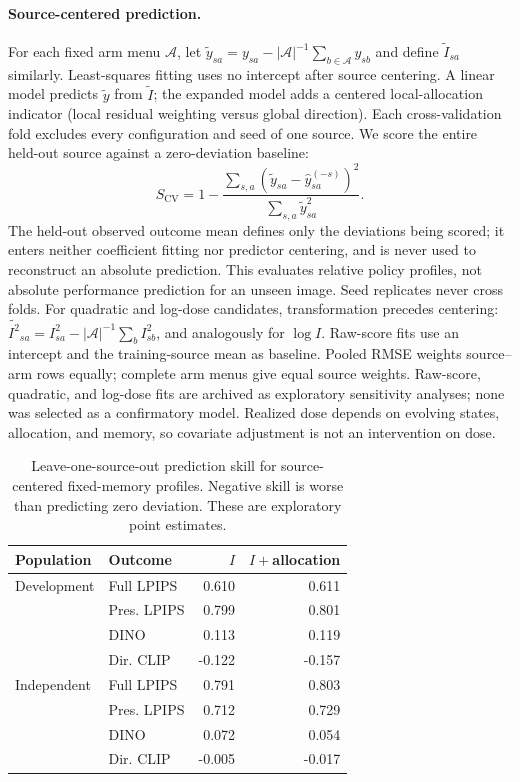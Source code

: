 \paragraph{Source-centered prediction.}
For each fixed arm menu $\mathcal A$, let $\widetilde y_{sa}=y_{sa}-|\mathcal A|^{-1}\sum_{b\in\mathcal A}y_{sb}$ and define $\widetilde I_{sa}$ similarly. Least-squares fitting uses no intercept after source centering. A linear model predicts $\widetilde y$ from $\widetilde I$; the expanded model adds a centered local-allocation indicator (local residual weighting versus global direction). Each cross-validation fold excludes every configuration and seed of one source. We score the entire held-out source against a zero-deviation baseline:
\begin{equation}
S_{\mathrm{CV}}=1-\frac{\sum_{s,a}(\widetilde y_{sa}-\widehat y_{sa}^{(-s)})^2}{\sum_{s,a}\widetilde y_{sa}^2}.
\end{equation}
The held-out observed outcome mean defines only the deviations being scored; it enters neither coefficient fitting nor predictor centering, and is never used to reconstruct an absolute prediction. This evaluates relative policy profiles, not absolute performance prediction for an unseen image. Seed replicates never cross folds. For quadratic and log-dose candidates, transformation precedes centering: $\widetilde{I^2}_{sa}=I_{sa}^2-|\mathcal A|^{-1}\sum_b I_{sb}^2$, and analogously for $\log I$. Raw-score fits use an intercept and the training-source mean as baseline. Pooled RMSE weights source--arm rows equally; complete arm menus give equal source weights. Raw-score, quadratic, and log-dose fits are archived as exploratory sensitivity analyses; none was selected as a confirmatory model. Realized dose depends on evolving states, allocation, and memory, so covariate adjustment is not an intervention on dose.

\begin{table}[t]
\centering\small
\caption{Leave-one-source-out prediction skill for source-centered fixed-memory profiles. Negative skill is worse than predicting zero deviation. These are exploratory point estimates.}
\label{tab:doseprediction}
\begin{tabular}{llrr}
\toprule
Population & Outcome & $I$ & $I+$allocation\\
\midrule
Development & Full LPIPS & 0.610 & 0.611\\
 & Pres. LPIPS & 0.799 & 0.801\\
 & DINO & 0.113 & 0.119\\
 & Dir. CLIP & -0.122 & -0.157\\
Independent & Full LPIPS & 0.791 & 0.803\\
 & Pres. LPIPS & 0.712 & 0.729\\
 & DINO & 0.072 & 0.054\\
 & Dir. CLIP & -0.005 & -0.017\\
\bottomrule
\end{tabular}
\end{table}

